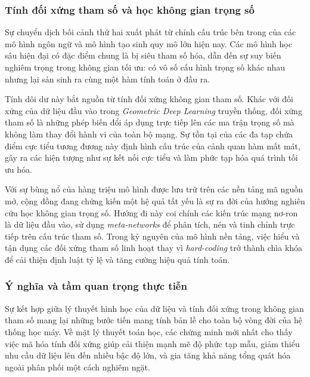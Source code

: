 \subsubsection{Tính đối xứng tham số và học không gian trọng số}
\label{subsubsec:doi-xung-tham-so}

Sự chuyển dịch bối cảnh thứ hai xuất phát từ chính cấu trúc bên trong của các mô hình ngôn ngữ và mô hình tạo sinh quy mô lớn hiện nay. Các mô hình học sâu hiện đại có đặc điểm chung là bị siêu tham số hóa, dẫn đến sự suy biến nghiêm trọng trong không gian tối ưu: có vô số cấu hình trọng số khác nhau nhưng lại sản sinh ra cùng một hàm tính toán ở đầu ra.

Tính dôi dư này bắt nguồn từ tính đối xứng không gian tham số. Khác với đối xứng của dữ liệu đầu vào trong \textit{Geometric Deep Learning} truyền thống, đối xứng tham số là những phép biến đổi áp dụng trực tiếp lên các ma trận trọng số mà không làm thay đổi hành vi của toàn bộ mạng. Sự tồn tại của các đa tạp chứa điểm cực tiểu tương đương này định hình cấu trúc của cảnh quan hàm mất mát, gây ra các hiện tượng như sự kết nối cực tiểu và làm phức tạp hóa quá trình tối ưu hóa.

\begin{morong}
Với sự bùng nổ của hàng triệu mô hình được lưu trữ trên các nền tảng mã nguồn mở, cộng đồng đang chứng kiến một hệ quả tất yếu là sự ra đời của hướng nghiên cứu học không gian trọng số. Hướng đi này coi chính các kiến trúc mạng nơ-ron là dữ liệu đầu vào, sử dụng \textit{meta-networks} để phân tích, nén và tinh chỉnh trực tiếp trên cấu trúc tham số. Trong kỷ nguyên của mô hình nền tảng, việc hiểu và tận dụng các đối xứng tham số linh hoạt thay vì \textit{hard-coding} trở thành chìa khóa để cải thiện định luật tỷ lệ và tăng cường hiệu quả tính toán.
\end{morong}

\subsubsection{Ý nghĩa và tầm quan trọng thực tiễn}
\label{subsubsec:y-nghia-thuc-tien}

Sự kết hợp giữa lý thuyết hình học của dữ liệu và tính đối xứng trong không gian tham số mang lại những bước tiến mang tính bản lề cho toàn bộ vòng đời của hệ thống học máy. Về mặt lý thuyết toán học, các chứng minh mới nhất cho thấy việc mã hóa tính đối xứng giúp cải thiện mạnh mẽ độ phức tạp mẫu, giảm thiểu nhu cầu dữ liệu lên đến nhiều bậc độ lớn, và gia tăng khả năng tổng quát hóa ngoài phân phối một cách nghiêm ngặt.

